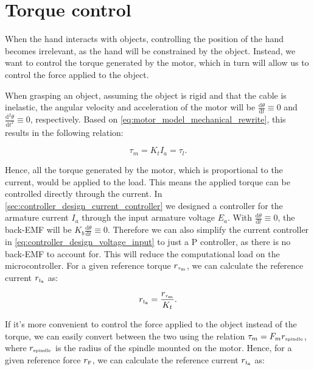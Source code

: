 \section{Torque control}
\label{sec:controller_design_torque_control}

When the hand interacts with objects, controlling the position of the hand becomes irrelevant, as the hand will be constrained by the object. Instead, we want to control the torque generated by the motor, which in turn will allow us to control the force applied to the object.


When grasping an object, assuming the object is rigid and that the cable is inelastic, the angular velocity and acceleration of the motor will be $\frac{\mathrm{d}\theta}{\mathrm{d}t} \equiv 0$ and $\frac{\mathrm{d}^2\theta}{\mathrm{d}t^2} \equiv 0$, respectively. Based on \cref{eq:motor_model_mechanical_rewrite}, this results in the following relation:

\begin{equation}
    \label{eq:motor_torque_equal_load_torque}
    \tau_m = K_t I_a = \tau_l.
\end{equation}

Hence, all the torque generated by the motor, which is proportional to the current, would be applied to the load. This means the applied torque can be controlled directly through the current. In \cref{sec:controller_design_current_controller} we designed a controller for the armature current $I_a$ through the input armature voltage $E_a$. With $\frac{\mathrm{d}\theta}{\mathrm{d}t} \equiv 0$, the back-EMF will be $K_b \frac{\mathrm{d}\theta}{\mathrm{d}t} \equiv 0$. Therefore we can also simplify the current controller in \cref{eq:controller_design_voltage_input} to just a P controller, as there is no back-EMF to account for. This will reduce the computational load on the microcontroller. For a given reference torque $r_{{\scriptscriptstyle\mathrm{\tau_m}}}$, we can calculate the reference current $r_{{\scriptscriptstyle\mathrm{I_a}}}$ as:

\begin{equation}
    \label{eq:controller_design_torque_control_reference}
    r_{{\scriptscriptstyle\mathrm{I_a}}} = \frac{r_{{\scriptscriptstyle\mathrm{\tau_m}}}}{K_t}.
\end{equation}

If it's more convenient to control the force applied to the object instead of the torque, we can easily convert between the two using the relation $\tau_m = F_m r_{{\scriptscriptstyle\mathrm{spindle}}}$, where $r_{{\scriptscriptstyle\mathrm{spindle}}}$ is the radius of the spindle mounted on the motor. Hence, for a given reference force $r_{{\scriptscriptstyle\mathrm{F}}}$, we can calculate the reference current $r_{{\scriptscriptstyle\mathrm{I_a}}}$ as:

